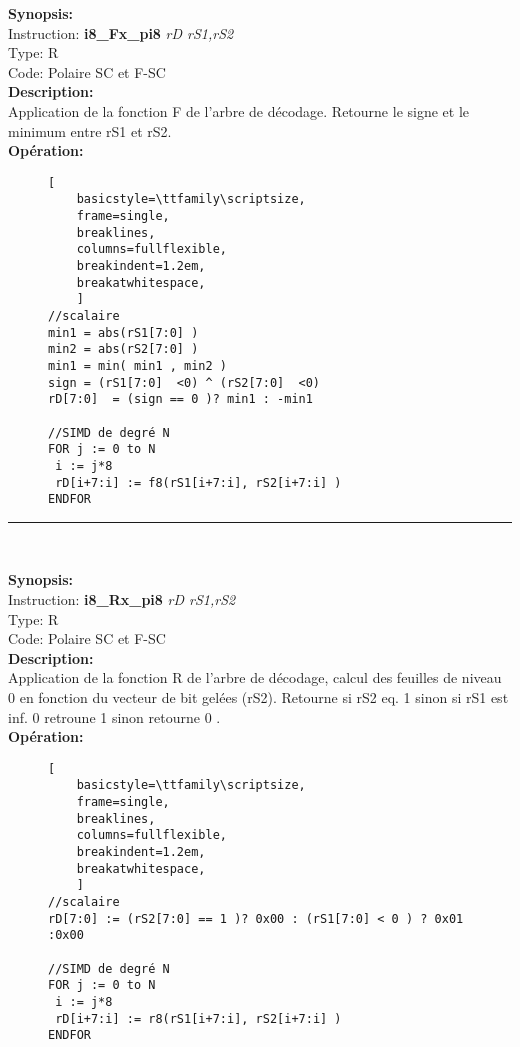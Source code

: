 {\scriptsize
\textbf{Synopsis:}\\
Instruction: \textbf{i8\_Fx\_pi8 } \textit{rD rS1,rS2}\\
Type: R\\
Code: Polaire SC et F-SC\\
\textbf{Description:}\\
Application de la fonction F de l'arbre de décodage. Retourne le signe et le minimum entre rS1 et rS2.\\
\textbf{Opération:}\\
    \begin{figure}[H]
    \begin{lstlisting}[
    basicstyle=\ttfamily\scriptsize,
    frame=single,
    breaklines,
    columns=fullflexible,
    breakindent=1.2em,
    breakatwhitespace,
    ]
//scalaire
min1 = abs(rS1[7:0] )
min2 = abs(rS2[7:0] )
min1 = min( min1 , min2 )
sign = (rS1[7:0]  <0) ^ (rS2[7:0]  <0)
rD[7:0]  = (sign == 0 )? min1 : -min1
    
//SIMD de degré N
FOR j := 0 to N    
 i := j*8    
 rD[i+7:i] := f8(rS1[i+7:i], rS2[i+7:i] ) 
ENDFOR
\end{lstlisting}
\end{figure}
}
\rule{8cm}{0.4pt}\\
{\scriptsize
\textbf{Synopsis:}\\
Instruction: \textbf{i8\_Rx\_pi8 } \textit{rD rS1,rS2}\\
Type: R\\
Code: Polaire SC et F-SC\\
\textbf{Description:}\\
Application de la fonction R de l'arbre de décodage, calcul des feuilles de niveau 0 en fonction du vecteur de bit gelées (rS2). Retourne si rS2 eq. 1 sinon si rS1 est inf. 0 retroune 1 sinon retourne 0 .\\
\textbf{Opération:}\\
    \begin{figure}[H]
    \begin{lstlisting}[
    basicstyle=\ttfamily\scriptsize,
    frame=single,
    breaklines,
    columns=fullflexible,
    breakindent=1.2em,
    breakatwhitespace,
    ]
//scalaire
rD[7:0] := (rS2[7:0] == 1 )? 0x00 : (rS1[7:0] < 0 ) ? 0x01 :0x00
    
//SIMD de degré N
FOR j := 0 to N    
 i := j*8    
 rD[i+7:i] := r8(rS1[i+7:i], rS2[i+7:i] ) 
ENDFOR
\end{lstlisting}
\end{figure}
}
